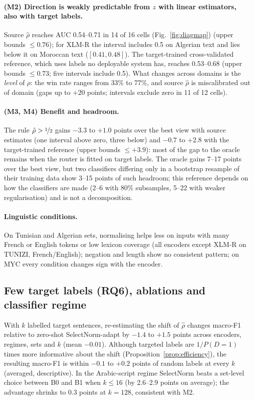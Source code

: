 \paragraph{(M2) Direction is weakly predictable from $z$ with linear estimators, also with target labels.} Source $\hat\rho$ reaches AUC 0.54--0.71 in 14 of 16 cells (Fig.~\ref{fig:diagmap}) (upper bounds $\le0.76$); for XLM-R the interval includes 0.5 on Algerian text and lies below it on Moroccan text ($[0.41,0.48]$). The target-trained cross-validated reference, which uses labels no deployable system has, reaches 0.53--0.68 (upper bounds $\le0.73$; five intervals include 0.5). What changes across domains is the \emph{level} of $\rho$: the win rate ranges from 33\% to 77\%, and source $\hat\rho$ is miscalibrated out of domain (gaps up to $+20$ points; intervals exclude zero in 11 of 12 cells).

\paragraph{(M3, M4) Benefit and headroom.} The rule $\hat\rho>\nicefrac12$ gains $-3.3$ to $+1.0$ points over the best view with source estimates (one interval above zero, three below) and $-0.7$ to $+2.8$ with the target-trained reference (upper bounds $\le+3.9$): most of the gap to the oracle remains when the router is fitted on target labels. The oracle gains 7--17 points over the best view, but two classifiers differing only in a bootstrap resample of their training data show 3--15 points of such headroom; this reference depends on how the classifiers are made (2--6 with 80\% subsamples, 5--22 with weaker regularisation) and is not a decomposition.

\paragraph{Linguistic conditions.} On Tunisian and Algerian sets, normalising helps less on inputs with many French or English tokens or low lexicon coverage (all encoders except XLM-R on TUNIZI, French/English); negation and length show no consistent pattern; on MYC every condition changes sign with the encoder.

\subsection{Few target labels (RQ6), ablations and classifier regime}
\label{sec:fewlabel}
With $k$ labelled target sentences, re-estimating the shift of $\hat\rho$ changes macro-F1 relative to zero-shot SelectNorm-adapt by $-1.4$ to $+1.5$ points across encoders, regimes, sets and $k$ (mean $-0.01$). Although targeted labels are $1/P(D{=}1)$ times more informative about the shift (Proposition~\ref{prop:efficiency}), the resulting macro-F1 is within $-0.1$ to $+0.2$ points of random labels at every $k$ (averaged, descriptive). In the Arabic-script regime SelectNorm beats a set-level choice between B0 and B1 when $k\le16$ (by 2.6--2.9 points on average); the advantage shrinks to 0.3 points at $k=128$, consistent with M2.

